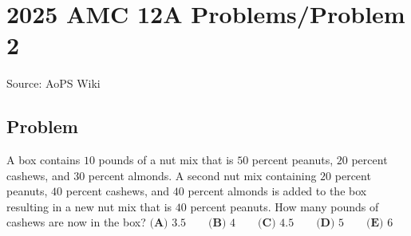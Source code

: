 \documentclass[12pt]{article}
\begin{document}
\section*{{2025 AMC 12A Problems/Problem 2}}
Source: AoPS Wiki

\subsection*{Problem}
A box contains $10$ pounds of a nut mix that is $50$ percent peanuts, $20$ percent cashews, and $30$ percent almonds. A second nut mix containing $20$ percent peanuts, $40$ percent cashews, and $40$ percent almonds is added to the box resulting in a new nut mix that is $40$ percent peanuts. How many pounds of cashews are now in the box? $\textbf{(A) } 3.5 \qquad\textbf{(B) } 4 \qquad\textbf{(C) } 4.5 \qquad\textbf{(D) } 5 \qquad\textbf{(E) } 6$
\end{document}
